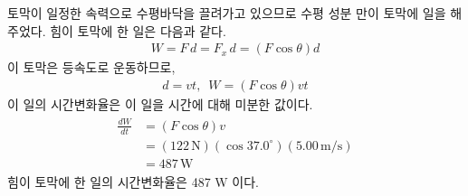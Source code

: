 \documentclass[floatfix,nofootinbib,superscriptaddress,fleqn]{revtex4-2}
\begin{document}
 토막이 일정한 속력으로 수평바닥을 끌려가고 있으므로 
 수평 성분 만이 토막에 일을 해주었다. 힘이 토막에 한 일은 다음과 같다.
 \begin{align}
   W = F\,d = F_x\,d = (F\cos{\theta})d
 \end{align}
 이 토막은 등속도로 운동하므로,
 \begin{align}
   d=vt,\,\,\,W=(F\cos{\theta})vt
 \end{align}
 이 일의 시간변화율은 이 일을 시간에 대해 미분한 값이다.
 \begin{align}
   \begin{split}
     \frac{dW}{dt} &= (F\cos{\theta})v  \\
     &= (122\,\mathrm{N})(\cos{37.0^\circ})(5.00\,\mathrm{m/s})  \\
     &= 487\,\mathrm{W}
   \end{split}
 \end{align}
 힘이 토막에 한 일의 시간변화율은 487 W 이다.
\end{document}
